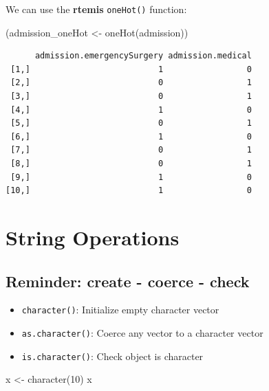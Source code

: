 \documentclass[
]{book}
\newenvironment{Shaded}{\begin{snugshade}}{\end{snugshade}}
\newcommand{\DecValTok}[1]{\textcolor[rgb]{0.00,0.00,0.81}{#1}}
\newcommand{\FunctionTok}[1]{\textcolor[rgb]{0.00,0.00,0.00}{#1}}
\newcommand{\NormalTok}[1]{#1}
\newcommand{\OtherTok}[1]{\textcolor[rgb]{0.56,0.35,0.01}{#1}}
\providecommand{\tightlist}{%
  \setlength{\itemsep}{0pt}\setlength{\parskip}{0pt}}
\begin{document}
We can use the \textbf{rtemis} \texttt{oneHot()} function:

\begin{Shaded}
\begin{Highlighting}[]
\NormalTok{(admission\_oneHot }\OtherTok{\textless{}{-}} \FunctionTok{oneHot}\NormalTok{(admission))}
\end{Highlighting}
\end{Shaded}

\begin{verbatim}
      admission.emergencySurgery admission.medical
 [1,]                          1                 0
 [2,]                          0                 1
 [3,]                          0                 1
 [4,]                          1                 0
 [5,]                          0                 1
 [6,]                          1                 0
 [7,]                          0                 1
 [8,]                          0                 1
 [9,]                          1                 0
[10,]                          1                 0
\end{verbatim}

\hypertarget{stringops}{%
\chapter{String Operations}\label{stringops}}

\hypertarget{reminder-create---coerce---check}{%
\section{Reminder: create - coerce - check}\label{reminder-create---coerce---check}}

\begin{itemize}
\tightlist
\item
  \texttt{character()}: Initialize empty character vector
\item
  \texttt{as.character()}: Coerce any vector to a character vector
\item
  \texttt{is.character()}: Check object is character
\end{itemize}

\begin{Shaded}
\begin{Highlighting}[]
\NormalTok{x }\OtherTok{\textless{}{-}} \FunctionTok{character}\NormalTok{(}\DecValTok{10}\NormalTok{)}
\NormalTok{x}
\end{Highlighting}
\end{Shaded}
\end{document}
